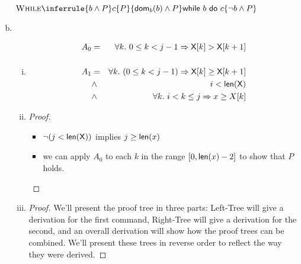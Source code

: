 \begin{enumerate}[(a)]
$\Rule{While}{
    \{ b \wedge P \}
    c
    \{ P \}
}{
    \{ \dom_b(b) \wedge P \}
    \whilestmt{b}{c}
    \{ \neg b \wedge P \}
}$

\item
\begin{enumerate}[i.]
    \item
    \begin{eqnarray*}
        A_0 & = & \forall k .~0 \leq k < j - 1 \Rightarrow  {\sf X}[k] > {\sf X}[k + 1] \\
              & & \\
        A_1 & = & \forall k.~(0 \leq k < j - 1) \Rightarrow \textsf{X}[k] \geq \textsf{X}[k + 1] \\
              & \wedge     & i < \textsf{len}(\textsf{X}) \\
              & \wedge     & \forall k .~i < k \leq j \Rightarrow  x \geq X[k]
    \end{eqnarray*}

    \item
    \begin{proof} \hspace{1cm} \\
        \begin{itemize}
        \item $\neg (j < {\sf len(X)})$ implies $j \geq {\sf len}(x)$
        \item we can apply $A_0$ to each $k$ in the range
        $[0, {\sf len}(x) - 2]$ to show that $P$ holds.
        \end{itemize}
    \end{proof}

    \item
    \begin{proof} We'll present the proof tree in three parts: Left-Tree will
        give a derivation for the first command, Right-Tree will give a
        derivation for the second, and an overall derivation will
        show how the proof trees can be combined. We'll present these trees
        in reverse order to reflect the way they were derived.

        \newcommand{\leftPremise}{
            \{ \dom_a(i + 1) \wedge \dom_a({\sf X}[i])
               \wedge A_1[i - 1 / i][i + 1 \mapsto \X[\X[i]
             \}
             ~\X[i = 1] = \X[i]~
             \{ A_1[i - 1/ i] \}
        }

        \newcommand{\leftBase}{
            \{ A_1 \wedge ((i \geq 0) \wedge {\sf X}[i] < x) \}
            ~\X[i = 1] = \X[i]~
            \{ A_1[i - 1/ i] \}
        }


\end{proof}
\end{enumerate}
\end{enumerate}
